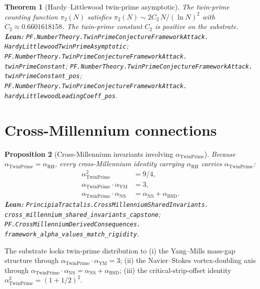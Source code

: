 \documentclass[11pt,a4paper]{article}
\theoremstyle{plain}
\newtheorem{theorem}{Theorem}[section]
\newtheorem{proposition}[theorem]{Proposition}
\theoremstyle{definition}
\begin{document}
\begin{theorem}[Hardy--Littlewood twin-prime asymptotic]
\label{thm:hl}
The twin-prime counting function $\pi_{2}(N)$ satisfies $\pi_{2}(N)
\sim 2 C_{2}\, N / (\ln N)^{2}$ with $C_{2} \approx 0.6601618158$. The
twin-prime constant $C_{2}$ is positive on the substrate.
\textbf{Lean:}
\texttt{PF.NumberTheory.TwinPrimeConjectureFrameworkAttack.\\
HardyLittlewoodTwinPrimeAsymptotic};
\texttt{PF.NumberTheory.TwinPrimeConjectureFrameworkAttack.\\
twinPrimeConstant};
\texttt{PF.NumberTheory.TwinPrimeConjectureFrameworkAttack.\\
twinPrimeConstant\_pos};
\texttt{PF.NumberTheory.TwinPrimeConjectureFrameworkAttack.\\
hardyLittlewoodLeadingCoeff\_pos}.
\end{theorem}

\section{Cross-Millennium connections}
\label{sec:cross-mill}

\begin{proposition}[Cross-Millennium invariants involving
$\alpha_{\mathrm{TwinPrime}}$]
\label{prop:cross-mill}
Because $\alpha_{\mathrm{TwinPrime}} = \alpha_{\mathrm{RH}}$, every
cross-Millennium identity carrying $\alpha_{\mathrm{RH}}$ carries
$\alpha_{\mathrm{TwinPrime}}$:
\[
\begin{aligned}
\alpha_{\mathrm{TwinPrime}}^{2} &= 9/4, \\
\alpha_{\mathrm{TwinPrime}} \cdot \alpha_{\mathrm{YM}} &= 3, \\
\alpha_{\mathrm{TwinPrime}} \cdot \alpha_{\mathrm{NS}} &=
  \alpha_{\mathrm{NS}} + \alpha_{\mathrm{BSD}}.
\end{aligned}
\]
\textbf{Lean:}
\texttt{PrincipiaTractalis.CrossMillenniumSharedInvariants.\\
cross\_millennium\_shared\_invariants\_capstone};
\texttt{PF.CrossMillenniumDerivedConsequences.\\
framework\_alpha\_values\_match\_rigidity}.
\end{proposition}

The substrate locks twin-prime distribution to (i) the Yang--Mills
mass-gap structure through
$\alpha_{\mathrm{TwinPrime}}\cdot\alpha_{\mathrm{YM}} = 3$;
(ii) the Navier--Stokes vortex-doubling axis through
$\alpha_{\mathrm{TwinPrime}}\cdot\alpha_{\mathrm{NS}} =
\alpha_{\mathrm{NS}} + \alpha_{\mathrm{BSD}}$;
(iii) the critical-strip-offset identity
$\alpha_{\mathrm{TwinPrime}}^{2} = (1+1/2)^{2}$.
\end{document}

